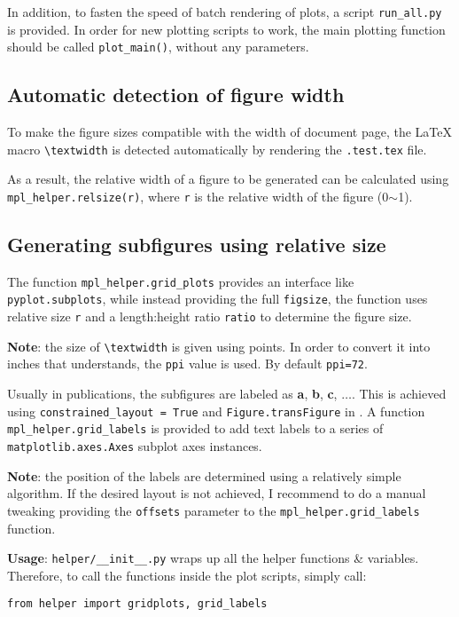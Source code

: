 In addition, to fasten the speed of batch rendering of plots, a script
\verb|run_all.py| is provided. In order for new plotting scripts to
work, the main plotting function should be called \verb|plot_main()|,
without any parameters. 

\subsection{Automatic detection of figure width}
\label{sec:autom-detet-figure}

To make the figure sizes compatible with the width of document page,
the \LaTeX{} macro \verb|\textwidth| is detected automatically by
rendering the \verb|.test.tex| file.


{\allowbreak
  As a result, the relative width of a figure to be generated can be
calculated using \verb|mpl_helper.relsize(r)|, where \texttt{r} is the
relative width of the figure (0$\sim{}$1).
\par}

\subsection{Generating subfigures using relative size}
\label{sec:gener-subf}

The function \verb|mpl_helper.grid_plots| provides an interface like
\verb|pyplot.subplots|, while instead providing the full
\texttt{figsize}, the function uses relative size \texttt{r} and a
length:height ratio \texttt{ratio} to determine the figure size.

\textbf{Note}: the size of \verb|\textwidth| is given using points. In
order to convert it into inches that \mpl{} understands, the
\verb|ppi| value is used. By default \verb|ppi=72|.

Usually in publications, the subfigures are labeled as \textbf{a},
\textbf{b}, \textbf{c}, $\dots$. This is achieved using
\verb|constrained_layout = True| and \verb|Figure.transFigure| in
\mpl{}. A function \verb|mpl_helper.grid_labels| is provided to add
text labels to a series of \verb|matplotlib.axes.Axes| subplot axes
instances. 

\textbf{Note}: the position of the labels are determined using a
relatively simple algorithm. If the desired layout is not achieved, I
recommend to do a manual tweaking providing the \verb|offsets|
parameter to the \verb|mpl_helper.grid_labels| function.

\textbf{Usage}: \verb|helper/__init__.py| wraps up all the helper
functions \& variables. Therefore, to call the functions inside the
plot scripts, simply call:
\begin{verbatim}
from helper import gridplots, grid_labels
\end{verbatim}

